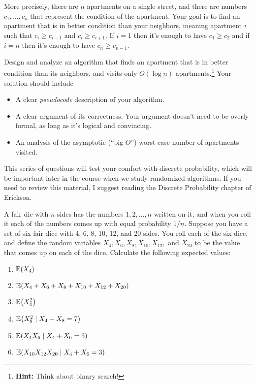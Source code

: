 \documentclass[11pt]{article}
\let\originalleft\left
\let\originalright\right
\renewcommand{\left}{\mathopen{}\mathclose\bgroup\originalleft}
\renewcommand{\right}{\aftergroup\egroup\originalright}
\newcommand{\ex}[2]{{\ifx&#1& \mathbb{E} \else \underset{#1}{\mathbb{E}} \fi \left(#2\right)}}
\theoremstyle{definition}
\begin{document}
\begin{enumerate}[leftmargin=0pt, itemsep=3ex]
More precisely, there are $n$ apartments on a single street, and there are numbers $c_1,\dots,c_n$ that represent the condition of the apartment.  Your goal is to find an apartment that is in better condition than your neighbors, meaning apartment $i$ such that $c_i \geq c_{i-1}$ and $c_i \geq c_{i+1}$.  If $i = 1$ then it's enough to have $c_1 \geq c_2$ and if $i = n$ then it's enough to have $c_n \geq c_{n-1}$.  

Design and analyze an algorithm that finds an apartment that is in better condition than its neighbors, and visits only $O(\log n)$ apartments.\footnote{{\bf Hint:} Think about binary search!}  Your solution should include
\begin{itemize}[nosep]
        \item A clear \emph{pseudocode} description of your algorithm.
        \item A clear argument of its correctness.  Your argument doesn't need to be overly formal, as long as it's logical and convincing.
        \item An analysis of the asymptotic (``big $O$'') worst-case number of apartments visited.
    \end{itemize}
    

\problemitem This series of questions will test your comfort with discrete probability, which will be important later in the course when we study randomized algorithms.  If you need to review this material, I suggest reading the Discrete Probability chapter of Erickson.


A fair die with $n$ sides has the numbers $1,2,\dots,n$ written on it, and when you roll it each of the numbers comes up with equal probability $1/n$.  Suppose you have a set of six fair dice with 4, 6, 8, 10, 12, and 20 sides.  You roll each of the six dice, and define the random variables $X_4, X_6, X_8, X_{10}, X_{12},$ and $X_{20}$ to be the value that comes up on each of the dice.  Calculate the following expected values:
\begin{enumerate}[leftmargin=0pt, itemsep=0ex]
    \item $\ex{}{X_{4}}$
    \item $\ex{}{X_{4} + X_{6} + X_{8} + X_{10} + X_{12} + X_{20}}$
    \item $\ex{}{X_{4}^{2}}$
    \item $\ex{}{X_{8}^{2} \mid X_{4} + X_{8} = 7}$
    \item $\ex{}{X_{4}X_{6} \mid X_{4} + X_{6} = 5}$
    \item $\ex{}{X_{10} X_{12} X_{20} \mid X_{4}  + X_{6} = 3}$
\end{enumerate}

\end{enumerate}
\end{document}
